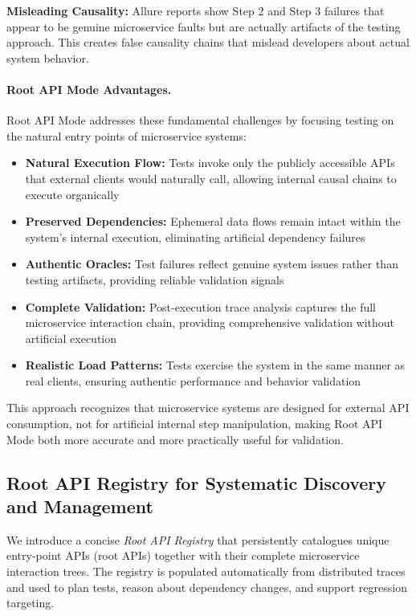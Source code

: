\documentclass[conference]{IEEEtran}
\begin{document}
\textbf{Misleading Causality:} Allure reports show Step 2 and Step 3 failures that appear to be genuine microservice faults but are actually artifacts of the testing approach. This creates false causality chains that mislead developers about actual system behavior.

\paragraph{Root API Mode Advantages.}
Root API Mode addresses these fundamental challenges by focusing testing on the natural entry points of microservice systems:

\begin{itemize}[leftmargin=*]
\item \textbf{Natural Execution Flow:} Tests invoke only the publicly accessible APIs that external clients would naturally call, allowing internal causal chains to execute organically
\item \textbf{Preserved Dependencies:} Ephemeral data flows remain intact within the system's internal execution, eliminating artificial dependency failures
\item \textbf{Authentic Oracles:} Test failures reflect genuine system issues rather than testing artifacts, providing reliable validation signals
\item \textbf{Complete Validation:} Post-execution trace analysis captures the full microservice interaction chain, providing comprehensive validation without artificial execution
\item \textbf{Realistic Load Patterns:} Tests exercise the system in the same manner as real clients, ensuring authentic performance and behavior validation
\end{itemize}

This approach recognizes that microservice systems are designed for external API consumption, not for artificial internal step manipulation, making Root API Mode both more accurate and more practically useful for validation.

\subsection{Root API Registry for Systematic Discovery and Management}\label{ssec:registry}

We introduce a concise \emph{Root API Registry} that persistently catalogues unique entry-point APIs (root APIs) together with their complete microservice interaction trees. The registry is populated automatically from distributed traces and used to plan tests, reason about dependency changes, and support regression targeting.
\end{document}
